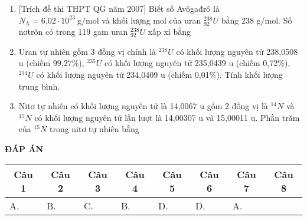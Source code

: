 \begin{enumerate}
{
	}
	\item {[Trích đề thi THPT QG năm 2007] Biết số Avôgađrô  là $N_{\text{A}} = \text{6,02} \cdot 10^{23}\ \text{g}/\text{mol}$ và khối lượng mol của uran $^{238}_{92}U$ bằng 238 g/mol. Số nơtrôn có trong 119 gam uran $^{238}_{92}U$ xấp xỉ bằng
	}
	\item {Uran tự nhiên gồm 3 đồng vị chính là $^{238} U$ có khối lượng nguyên tử 238,0508 u (chiếm $\text{99,27}\%$), $^{235} U$ có khối lượng nguyên tử 235,0439 u (chiếm 0,72$\%$), $^{234} U$ có khối lượng nguyên tử 234,0409 u (chiếm 0,01$\%$). Tính khối lượng trung bình.
	}
	\item {Nitơ tự nhiên có khối lượng nguyên tử là 14,0067 u gồm 2 đồng vị là $^{14} N$ và $^{15} N$ có khối lượng nguyên tử lần lượt là 14,00307 u và 15,00011 u. Phần trăm của $^{15} N$ trong nitơ tự nhiên bằng
	}
\end{enumerate}

\textbf{ĐÁP ÁN}
\begin{longtable}[\textwidth]{|p{}|p{}|p{}|p{}|p{}|p{}|p{}|p{}|}
	\hline%
	\multicolumn{1}{|c|}{\textbf{Câu 1}} & \multicolumn{1}{c|}{\textbf{Câu 2}} & \multicolumn{1}{c|}{\textbf{Câu 3}} &
	\multicolumn{1}{c|}{\textbf{Câu 4}} &
	\multicolumn{1}{c|}{\textbf{Câu 5}} &
	\multicolumn{1}{c|}{\textbf{Câu 6}} &
	\multicolumn{1}{c|}{\textbf{Câu 7}} &
	\multicolumn{1}{c|}{\textbf{Câu 8}} \\
	\hline
	A.&B. &C. &B. &D. &D. &A. &	\\
	\hline
\end{longtable}

